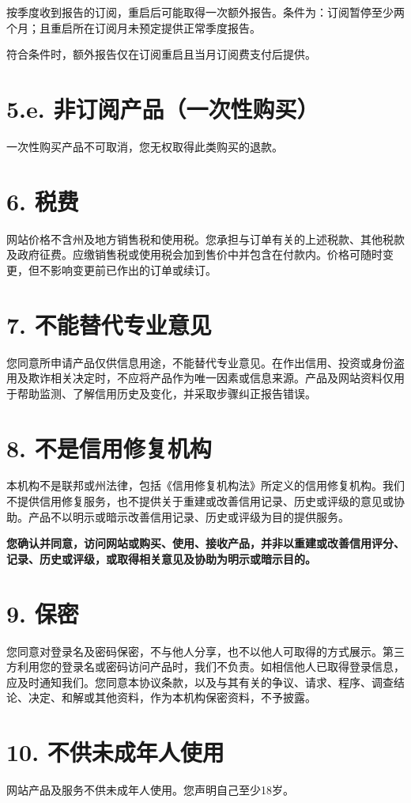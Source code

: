 \documentclass[UTF8,fontset=none,11pt,a4paper]{ctexart}
\begin{document}
按季度收到报告的订阅，重启后可能取得一次额外报告。条件为：订阅暂停至少两个月；且重启所在订阅月未预定提供正常季度报告。


符合条件时，额外报告仅在订阅重启且当月订阅费支付后提供。


\section*{5.e. 非订阅产品（一次性购买）}
一次性购买产品不可取消，您无权取得此类购买的退款。


\section*{6. 税费}
网站价格不含州及地方销售税和使用税。您承担与订单有关的上述税款、其他税款及政府征费。应缴销售税或使用税会加到售价中并包含在付款内。价格可随时变更，但不影响变更前已作出的订单或续订。


\section*{7. 不能替代专业意见}
您同意所申请产品仅供信息用途，不能替代专业意见。在作出信用、投资或身份盗用及欺诈相关决定时，不应将产品作为唯一因素或信息来源。产品及网站资料仅用于帮助监测、了解信用历史及变化，并采取步骤纠正报告错误。


\section*{8. 不是信用修复机构}
本机构不是联邦或州法律，包括《信用修复机构法》所定义的信用修复机构。我们不提供信用修复服务，也不提供关于重建或改善信用记录、历史或评级的意见或协助。产品不以明示或暗示改善信用记录、历史或评级为目的提供服务。


\textbf{您确认并同意，访问网站或购买、使用、接收产品，并非以重建或改善信用评分、记录、历史或评级，或取得相关意见及协助为明示或暗示目的。}


\section*{9. 保密}
您同意对登录名及密码保密，不与他人分享，也不以他人可取得的方式展示。第三方利用您的登录名或密码访问产品时，我们不负责。如相信他人已取得登录信息，应及时通知我们。您同意本协议条款，以及与其有关的争议、请求、程序、调查结论、决定、和解或其他资料，作为本机构保密资料，不予披露。


\section*{10. 不供未成年人使用}
网站产品及服务不供未成年人使用。您声明自己至少18岁。
\end{document}
